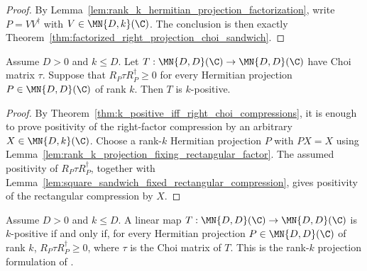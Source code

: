 \begin{proof}
    \leanok
    By Lemma~\ref{lem:rank_k_hermitian_projection_factorization}, write
    $P=VV^\dagger$ with $V\in\MN{D,k}(\C)$. The conclusion is then exactly
    Theorem~\ref{thm:factorized_right_projection_choi_sandwich}.
\end{proof}

\begin{theorem}
    \label{thm:rank_k_right_projection_choi_sandwich_converse}
    \leanok
    Assume $D>0$ and $k\le D$. Let
    $T:\MN{D,D}(\C)\to\MN{D,D}(\C)$ have Choi matrix $\tau$. Suppose that
    $R_P\tau R_P^\dagger\geq0$ for every Hermitian projection
    $P\in\MN{D,D}(\C)$ of rank $k$. Then $T$ is $k$-positive.
\end{theorem}

\begin{proof}
    \leanok
    By Theorem~\ref{thm:k_positive_iff_right_choi_compressions}, it is enough
    to prove positivity of the right-factor compression by an arbitrary
    $X\in\MN{D,k}(\C)$. Choose a rank-$k$ Hermitian projection $P$ with
    $PX=X$ using
    Lemma~\ref{lem:rank_k_projection_fixing_rectangular_factor}. The assumed
    positivity of $R_P\tau R_P^\dagger$, together with
    Lemma~\ref{lem:square_sandwich_fixed_rectangular_compression}, gives
    positivity of the rectangular compression by $X$.
\end{proof}

\begin{theorem}
    \label{thm:rank_k_right_projection_choi_criterion}
    \leanok
    Assume $D>0$ and $k\le D$. A linear map
    $T:\MN{D,D}(\C)\to\MN{D,D}(\C)$ is $k$-positive if and only if, for every
    Hermitian projection $P\in\MN{D,D}(\C)$ of rank $k$,
    $R_P\tau R_P^\dagger\geq0$, where $\tau$ is the Choi matrix of $T$.
    This is the rank-$k$ projection formulation of
    \cite[Chapter~3, Proposition~3.1]{Wolf2012Quantum}.
\end{theorem}

